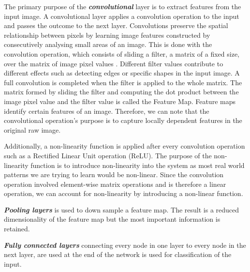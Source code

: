 The primary purpose of the \textbf{\textit{convolutional}} layer is to extract features from the input image. A convolutional layer applies a convolution operation to the input and passes the outcome to the next layer. Convolutions preserve the spatial relationship between pixels by learning image features constructed by consecutively analysing small areas of an image. This is done with the convolution operation, which consists of sliding a filter, a matrix of a fixed size, over the matrix of image pixel values \cite{cnnsliding}. Different filter values contribute to different effects such as detecting edges or specific shapes in the input image. A full convolution is completed when the filter is applied to the whole matrix. The matrix formed by sliding the filter and computing the dot product between the image pixel value and the filter value is called the Feature Map.  Feature maps identify certain features of an image. Therefore, we can note that the convolutional operation's purpose is to capture locally dependent features in the original raw image. 

Additionally, a non-linearity function is applied after every convolution operation such as a Rectified Linear Unit operation (ReLU). The purpose of the non-linearity function is to introduce non-linearity into the system as most real world patterns we are trying to learn would be non-linear. Since the convolution operation involved element-wise matrix operations and is therefore a linear operation, we can account for non-linearity by introducing a non-linear function.

\textbf{\textit{Pooling layers}} is used to down sample a feature map. The result is a reduced dimensionality of the feature map but the most important information is retained. 

\textbf{\textit{Fully connected layers}} connecting every node in one layer to every node in the next layer, are used at the end of the network is used for classification of the input.

